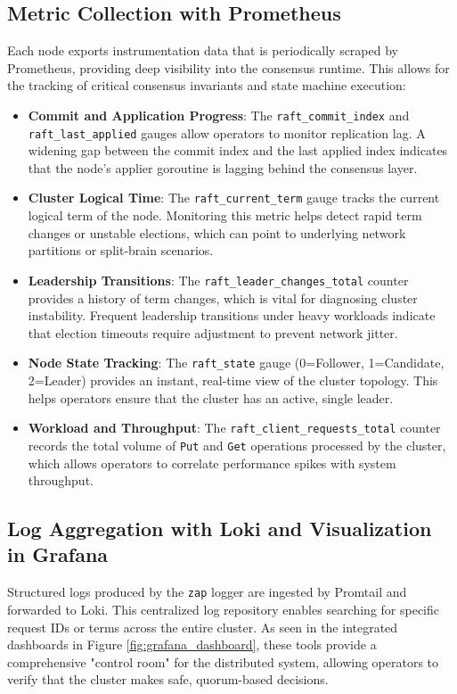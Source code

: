 \subsection{Metric Collection with Prometheus}
Each node exports instrumentation data that is periodically scraped by Prometheus, providing deep visibility into the consensus runtime. This allows for the tracking of critical consensus invariants and state machine execution:
\begin{itemize}
    \item \textbf{Commit and Application Progress}: The \texttt{raft\_commit\_index} and \texttt{raft\_last\_applied} gauges allow operators to monitor replication lag. A widening gap between the commit index and the last applied index indicates that the node's applier goroutine is lagging behind the consensus layer.
    
    \item \textbf{Cluster Logical Time}: The \texttt{raft\_current\_term} gauge tracks the current logical term of the node. Monitoring this metric helps detect rapid term changes or unstable elections, which can point to underlying network partitions or split-brain scenarios.
    
    \item \textbf{Leadership Transitions}: The \texttt{raft\_leader\_changes\_total} counter provides a history of term changes, which is vital for diagnosing cluster instability. Frequent leadership transitions under heavy workloads indicate that election timeouts require adjustment to prevent network jitter.
    
    \item \textbf{Node State Tracking}: The \texttt{raft\_state} gauge (0=Follower, 1=Candidate, 2=Leader) provides an instant, real-time view of the cluster topology. This helps operators ensure that the cluster has an active, single leader.
    
    \item \textbf{Workload and Throughput}: The \texttt{raft\_client\_requests\_total} counter records the total volume of \texttt{Put} and \texttt{Get} operations processed by the cluster, which allows operators to correlate performance spikes with system throughput.
\end{itemize}

\subsection{Log Aggregation with Loki and Visualization in Grafana}
Structured logs produced by the \texttt{zap} logger are ingested by Promtail and forwarded to Loki.
This centralized log repository enables searching for specific request IDs or terms across the entire cluster.
As seen in the integrated dashboards in Figure \ref{fig:grafana_dashboard}, these tools provide a comprehensive "control room" for the distributed system, allowing operators to verify that the cluster makes safe, quorum-based decisions.

